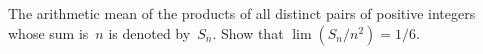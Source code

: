 The arithmetic mean of the products of all distinct pairs of positive
integers whose sum is~$n$ is denoted by~$S_{n}$. Show that $\lim(S_{n}/n^{2}) = 1/6$.

